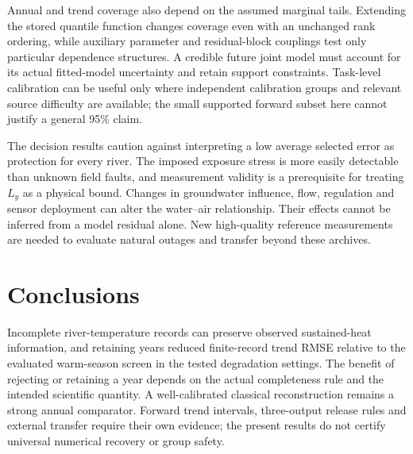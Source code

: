 \documentclass[draft,linenumbers]{agujournal2025}
\begin{document}
Annual and trend coverage also depend on the assumed marginal tails. Extending the stored quantile function changes coverage even with an unchanged rank ordering, while auxiliary parameter and residual-block couplings test only particular dependence structures. A credible future joint model must account for its actual fitted-model uncertainty and retain support constraints. Task-level calibration can be useful only where independent calibration groups and relevant source difficulty are available; the small supported forward subset here cannot justify a general 95\% claim.

The decision results caution against interpreting a low average selected error as protection for every river. The imposed exposure stress is more easily detectable than unknown field faults, and measurement validity is a prerequisite for treating $L_y$ as a physical bound. Changes in groundwater influence, flow, regulation and sensor deployment can alter the water--air relationship. Their effects cannot be inferred from a model residual alone. New high-quality reference measurements are needed to evaluate natural outages and transfer beyond these archives.

\section{Conclusions}
Incomplete river-temperature records can preserve observed sustained-heat information, and retaining years reduced finite-record trend RMSE relative to the evaluated warm-season screen in the tested degradation settings. The benefit of rejecting or retaining a year depends on the actual completeness rule and the intended scientific quantity. A well-calibrated classical reconstruction remains a strong annual comparator. Forward trend intervals, three-output release rules and external transfer require their own evidence; the present results do not certify universal numerical recovery or group safety.
\end{document}
